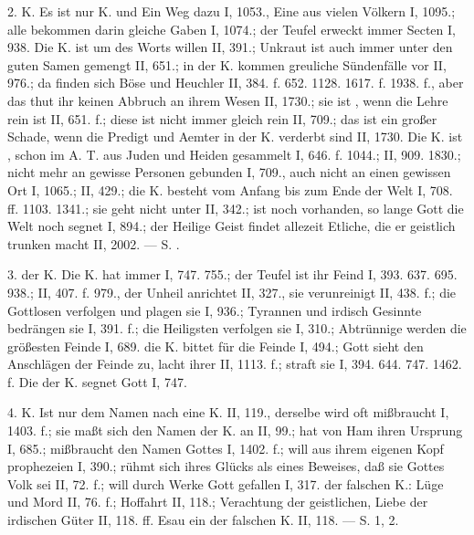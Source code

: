 2.  K. Es ist nur  K. und Ein Weg dazu I, 1053., Eine aus vielen Völkern I, 1095.; alle bekommen darin gleiche Gaben I, 1074.; der Teufel erweckt immer Secten I, 938. Die K. ist  um des Worts willen II, 391.; Unkraut ist auch immer unter den guten Samen gemengt II, 651.; in der K. kommen greuliche Sündenfälle vor II, 976.; da finden sich Böse und Heuchler II, 384. f. 652. 1128. 1617. f. 1938. f., aber das thut ihr keinen Abbruch an ihrem Wesen II, 1730.; sie ist , wenn die Lehre rein ist II, 651. f.; diese ist nicht immer gleich rein II, 709.; das ist ein großer Schade, wenn die Predigt und Aemter in der K. verderbt sind II, 1730. Die K. ist , schon im A. T. aus Juden und Heiden gesammelt I, 646. f. 1044.; II, 909. 1830.; nicht mehr an gewisse Personen gebunden I, 709., auch nicht an einen gewissen Ort I, 1065.; II, 429.; die K. besteht  vom Anfang bis zum Ende der Welt I, 708. ff. 1103. 1341.; sie geht nicht unter II, 342.; ist noch vorhanden, so lange Gott die Welt noch segnet I, 894.; der Heilige Geist findet allezeit Etliche, die er geistlich trunken macht II, 2002. — S. .

3.  der K. Die K. hat immer  I, 747. 755.; der Teufel ist ihr Feind I, 393. 637. 695. 938.; II, 407. f. 979., der Unheil anrichtet II, 327., sie verunreinigt II, 438. f.; die Gottlosen verfolgen und plagen sie I, 936.; Tyrannen und irdisch Gesinnte bedrängen sie I, 391. f.; die Heiligsten verfolgen sie I, 310.; Abtrünnige werden die größesten Feinde I, 689. die K. bittet für die Feinde I, 494.; Gott sieht den Anschlägen der Feinde zu, lacht ihrer II, 1113. f.; straft sie I, 394. 644. 747. 1462. f. Die  der K. segnet Gott I, 747.

4.  K. Ist nur dem Namen nach eine K. II, 119., derselbe wird oft mißbraucht I, 1403. f.; sie maßt sich den Namen der K. an II, 99.; hat von Ham ihren Ursprung I, 685.; mißbraucht den Namen Gottes I, 1402. f.; will aus ihrem eigenen Kopf prophezeien I, 390.; rühmt sich ihres Glücks als eines Beweises, daß sie Gottes Volk sei II, 72. f.; will durch Werke Gott gefallen I, 317.  der falschen K.: Lüge und Mord II, 76. f.; Hoffahrt II, 118.; Verachtung der geistlichen, Liebe der irdischen Güter II, 118. ff. Esau ein  der falschen K. II, 118. — S.  1,  2.

